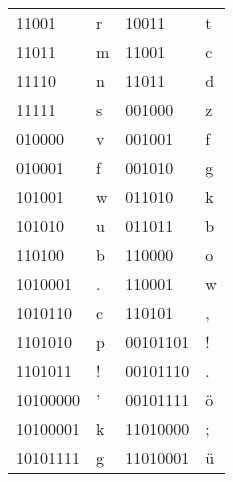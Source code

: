 \documentclass[12pt, authoryear]{elsarticle}
\begin{document}
\begin{table}[]
\begin{tabular}{|l|l|l|l|}
		11001                         & r                             & 10011                           & t                          \\
		11011                         & m                             & 11001                           & c                          \\
		11110                         & n                             & 11011                           & d                          \\
		11111                         & s                             & 001000                            & z                          \\
		010000                         & v                             & 001001                            & f                          \\
		010001                         & f                             & 001010                            & g                          \\
		101001                        & w                             & 011010                           & k                          \\
		101010                        & u                             & 011011                           & b                          \\
		110100                        & b                             & 110000                          & o                          \\
		1010001                       & .                             & 110001                          & w                          \\
		1010110                       & c                             & 110101                          &     ,                       \\
		1101010                       & p                             & 00101101                          & !                          \\
		1101011                       & !                             & 00101110                          & .                          \\
		10100000                      & '                             & 00101111                          & \"{o}                          \\
		10100001                      & k                             & 11010000                        & ;                          \\
		10101111                      & g                             & 11010001                        & \"{u}                          \\

\end{tabular}
\end{table}
\end{document}
